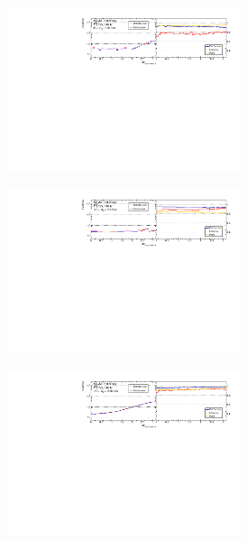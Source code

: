 \begin{figure}[htb]
    \centering 
    \begin{subfigure}{.99\textwidth}\centering
        \includegraphics[width = 0.75\textwidth]{Figures/m4l/UnfoldingStudies/v014_inputs/deltaPhiLeadingLeptons_m4l60-100inputs.pdf}
    \end{subfigure}
    \begin{subfigure}{.99\textwidth}\centering
        \includegraphics[width = 0.75\textwidth]{Figures/m4l/UnfoldingStudies/v014_inputs/deltaPhiLeadingLeptons_m4l120-130inputs.pdf}
    \end{subfigure}
    \begin{subfigure}{.99\textwidth}\centering
        \includegraphics[width = 0.75\textwidth]{Figures/m4l/UnfoldingStudies/v014_inputs/deltaPhiLeadingLeptons_m4l180-2000inputs.pdf}

\end{subfigure}
\end{figure}

